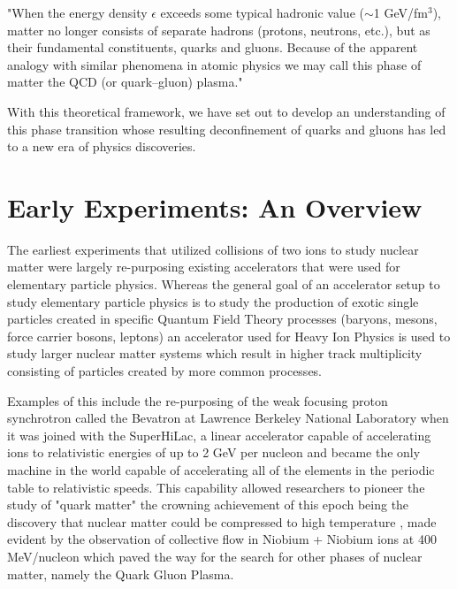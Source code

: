 \begin{addmargin}[1.5em]{2em}
"When the energy density $\epsilon$ exceeds some typical hadronic value ($\sim$1 GeV/fm$^{3}$), matter no longer consists of separate hadrons (protons, neutrons, etc.), but as their fundamental constituents, quarks and gluons. Because of the apparent analogy with similar phenomena in atomic physics we may call this phase of matter the QCD (or quark–gluon) plasma."
\end{addmargin}
 
With this theoretical framework, we have set out to develop an understanding of this phase transition whose resulting deconfinement of quarks and gluons has led to a new era of physics discoveries.

\section{Early Experiments: An Overview}
The earliest experiments that utilized collisions of two ions to study nuclear matter were largely re-purposing existing accelerators that were used for elementary particle physics. Whereas the general goal of an accelerator setup to study elementary particle physics is to study the production of exotic single particles created in specific Quantum Field Theory processes (baryons, mesons, force carrier bosons, leptons) an accelerator used for Heavy Ion Physics is used to study larger nuclear matter systems which result in higher track multiplicity consisting of particles created by more common processes. 

Examples of this include the re-purposing of the weak focusing proton synchrotron called the Bevatron at Lawrence Berkeley National Laboratory when it was joined with the SuperHiLac, a linear accelerator capable of accelerating ions to relativistic energies of up to 2 GeV per nucleon and became the only machine in the world capable of accelerating all of the elements in the periodic table to relativistic speeds. This capability allowed researchers to pioneer the study of "quark matter" \citep{bevalac9lives} the crowning achievement of this epoch being the discovery that nuclear matter could be compressed to high temperature \citep{ROBINSON857}, made evident by the observation of collective flow in Niobium + Niobium ions at 400 MeV/nucleon \citep{PhysRevLett.52.1590} which paved the way for the search for other phases of nuclear matter, namely the Quark Gluon Plasma.

